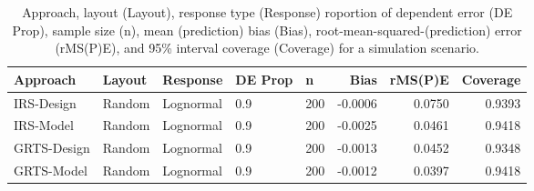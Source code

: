 \documentclass[]{elsarticle} %
\begin{document}
\begin{table}[ht]
\centering
\begin{tabular}{lllllrrr}
  \hline
Approach & Layout & Response & DE Prop & n & Bias & rMS(P)E & Coverage \\ 
  \hline
IRS-Design & Random & Lognormal & 0.9 & 200 & -0.0006 & 0.0750 & 0.9393 \\ 
  IRS-Model & Random & Lognormal & 0.9 & 200 & -0.0025 & 0.0461 & 0.9418 \\ 
  GRTS-Design & Random & Lognormal & 0.9 & 200 & -0.0013 & 0.0452 & 0.9348 \\ 
  GRTS-Model & Random & Lognormal & 0.9 & 200 & -0.0012 & 0.0397 & 0.9418 \\ 
   \hline
\end{tabular}
\caption{Approach, layout (Layout), response type (Response) roportion of dependent error (DE Prop), sample size (n), mean (prediction) bias (Bias), root-mean-squared-(prediction) error (rMS(P)E), and 95\% interval coverage (Coverage) for a simulation scenario.} 
\end{table}
\end{document}
